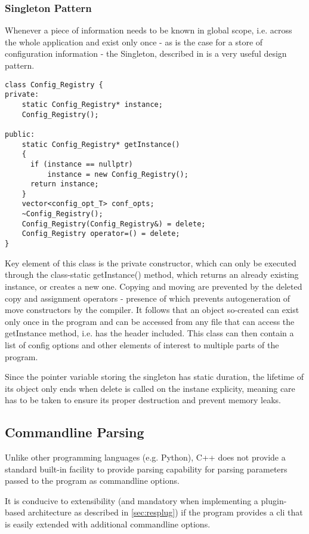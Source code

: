 \subsubsection{Singleton Pattern}
\label{sec:ston}
Whenever a piece of information needs to be known in global scope, i.e. across the whole application and exist only once - as is the case for a store of configuration information - the Singleton, described in \citet[pp. 127ff]{Gamma1994} is a very useful design pattern. 

\begin{lstlisting}
class Config_Registry {
private:
    static Config_Registry* instance; 
    Config_Registry();

public:
    static Config_Registry* getInstance()
    {
      if (instance == nullptr)
          instance = new Config_Registry();
      return instance;
    }
    vector<config_opt_T> conf_opts;
    ~Config_Registry();
    Config_Registry(Config_Registry&) = delete;
    Config_Registry operator=() = delete;
}

\end{lstlisting}
Key element of this class is the private constructor, which can only be executed through the class-static getInstance() method, which returns an already existing instance, or creates a new one.
Copying and moving are prevented by the deleted copy and assignment operators - presence of which prevents autogeneration of move constructors by the compiler.
It follows that an object so-created can exist only once in the program and can be accessed from any file that can access the getInstance method, i.e. has the header included. 
This class can then contain a list of config options and other elements of interest to multiple parts of the program. 

Since the pointer variable storing the singleton has static duration, the lifetime of its object only ends when delete is called on the instane explicity, meaning care has to be taken to ensure its proper destruction and prevent memory leaks.

\subsection{Commandline Parsing}
Unlike other programming languages (e.g. Python), C++ does not provide a standard built-in facility to provide parsing capability for parsing parameters passed to the program as commandline options.

It is conducive to extensibility (and mandatory when implementing a plugin-based architecture as described in \ref{sec:resplug}) if the program provides a \gls{cli} that is easily extended with additional commandline options.

